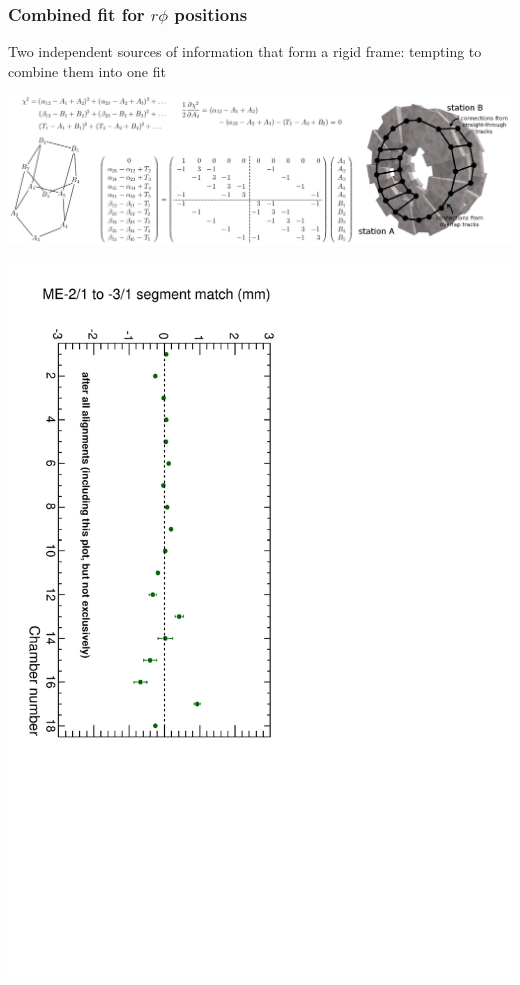 \documentclass[compress]{beamer}
\begin{document}
\begin{frame}
\frametitle{Combined fit for $r\phi$ positions}
\small
Two independent sources of information that form a rigid frame: tempting to combine them into one fit
\begin{center}
\includegraphics[width=0.9\linewidth]{matrix_description.png}

\vspace{0.2 cm}
\includegraphics[height=0.7\linewidth, angle=90]{final_match.pdf}
\end{center}
\end{frame}
\end{document}
